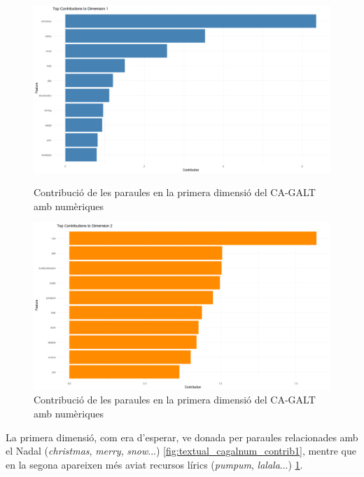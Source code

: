 \begin{figure}[H]
\centering
    \begin{minipage}{.4\textwidth}
        \centering
        \includegraphics[width=0.95\linewidth]{Images//8_Textual//Analysis/cagalt_contrib_1.png}
        \caption{Contribució de les paraules en la primera dimensió del CA-GALT amb numèriques}
        \label{fig:textual_cagalnum_contrib1}
    \end{minipage}%
    \begin{minipage}{.4\textwidth}
        \centering
        \includegraphics[width=0.95\linewidth]{Images//8_Textual//Analysis/cagalt_contrib_2.png}
        \caption{Contribució de les paraules en la primera dimensió del CA-GALT amb numèriques}
        \label{fig:textual_cagalnum_contrib2}
    \end{minipage}%
\end{figure}

La primera dimensió, com era d'esperar, ve donada per paraules relacionades amb el Nadal (\textit{christmas}, \textit{merry}, \textit{snow}...) \ref{fig:textual_cagalnum_contrib1}, mentre que en la segona apareixen més aviat recursos lírics (\textit{pumpum}, \textit{lalala}...) \ref{fig:textual_cagalnum_contrib2}.

